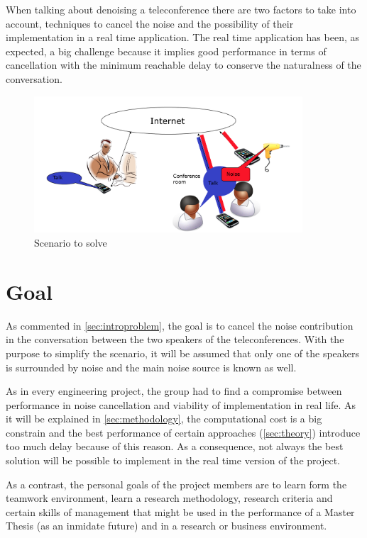 \documentclass[11pt,a4paper,english]{book}  %
\theoremstyle{definition}  %
\theoremstyle{plain}  %
\theoremstyle{remark}  %
\begin{document}
	When talking about denoising a teleconference there are two factors to take into account, techniques to cancel the noise and the possibility of their implementation in a real time application. The real time application has been, as expected, a big challenge because it implies good performance in terms of cancellation with the minimum reachable delay to conserve the naturalness of the conversation.
	
		\begin{figure}[h]
		\centering
		\includegraphics[width=10cm]{images/other/scenario}
		\caption{Scenario to solve}
		\label{scenario2}
		\end{figure}
	
	
	
	\section{Goal}
	As commented in \ref{sec:introproblem}, the goal is to cancel the noise contribution in the conversation between the two speakers of the teleconferences. With the purpose to simplify the scenario, it will be assumed that only one of the speakers is surrounded by noise and the main noise source is known as well.
	
	As in every engineering project, the group had to find a compromise between performance in noise cancellation and viability of implementation in real life. As it will be explained in \ref{sec:methodology}, the computational cost is a big constrain and the best performance of certain approaches (\ref{sec:theory}) introduce too much delay because of this reason. As a consequence, not always the best solution will be possible to implement in the real time version of the project.
	
	As a contrast, the personal goals of the project members are to learn form the teamwork environment, learn a research methodology, research criteria and certain skills of management that might be used in the performance of a Master Thesis (as an inmidate future) and in a research or business environment.
	
\end{document}
